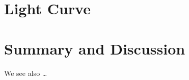 \documentclass[modern]{aastex63}
\begin{document}
    \section{Light Curve}

    \section{Summary and Discussion}
    We see also \dots 
    



{}


\end{document}
